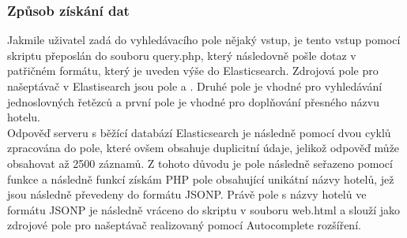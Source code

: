 \documentclass[czech,BP]{thesiskiv}
\begin{document}
\subsubsection{Způsob získání dat}
Jakmile uživatel zadá do vyhledávacího pole nějaký vstup, je tento vstup pomocí skriptu přeposlán do souboru query.php, který následovně pošle dotaz v patřičném formátu, který je uveden výše do Elasticsearch. Zdrojová pole pro našeptávač v Elastisearch jsou pole  a . Druhé pole je vhodné pro vyhledávání jednoslovných řetězců a první pole je vhodné pro doplňování přesného názvu hotelu.
	\\
Odpověď serveru s běžící databází Elasticsearch je následně pomocí dvou cyklů zpracována do pole, které ovšem obsahuje duplicitní údaje, jelikož odpověď může obsahovat až 2500 záznamů. Z tohoto důvodu je pole následně seřazeno pomocí funkce  a následně funkcí  získám PHP pole obsahující unikátní názvy hotelů, jež jsou následně převedeny do formátu JSONP. Právě pole s názvy hotelů ve formátu JSONP je následně vráceno do skriptu v souboru web.html a slouží jako zdrojové pole pro našeptávač realizovaný pomocí Autocomplete rozšíření.
\end{document}
